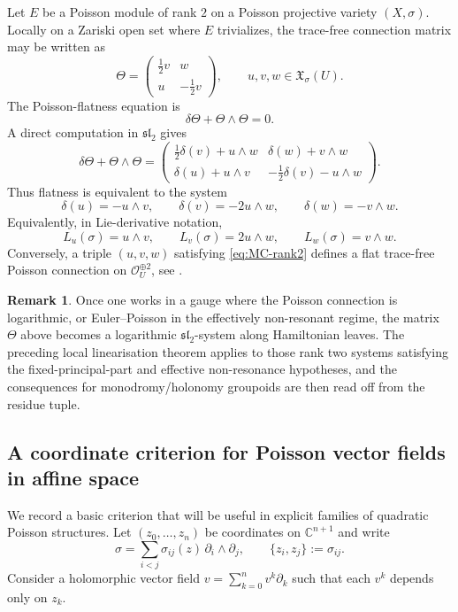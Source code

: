 \documentclass[11pt]{amsart}
\theoremstyle{plain}
\theoremstyle{definition}
\newtheorem{remark}[theorem]{Remark}
\theoremstyle{definition}
\newcommand{\OO}{\mathcal{O}}
\begin{document}
Let \(E\) be a Poisson module of rank \(2\) on a Poisson projective variety \((X,\sigma)\).  Locally on a
Zariski open set where \(E\) trivializes, the trace-free connection matrix may be written as
\[
\Theta=
\begin{pmatrix}
\frac12 v & w\\
u & -\frac12 v
\end{pmatrix},
\qquad
u,v,w\in\mathfrak X_\sigma(U).
\]
The Poisson-flatness equation is
\[
        \delta\Theta+\Theta\wedge\Theta=0.
\]
A direct computation in \(\mathfrak{sl}_2\) gives
\[
\delta\Theta+\Theta\wedge\Theta=
\begin{pmatrix}
\frac12\delta(v)+u\wedge w & \delta(w)+v\wedge w\\
\delta(u)+u\wedge v & -\frac12\delta(v)-u\wedge w
\end{pmatrix}.
\]
Thus flatness is equivalent to the system
\begin{equation}\label{eq:MC-rank2}
\delta(u)=-u\wedge v,
\qquad
\delta(v)=-2u\wedge w,
\qquad
\delta(w)=-v\wedge w.
\end{equation}
Equivalently, in Lie-derivative notation,
\begin{equation}\label{eq:MC-rank2-Lie}
L_u(\sigma)=u\wedge v,
\qquad
L_v(\sigma)=2u\wedge w,
\qquad
L_w(\sigma)=v\wedge w.
\end{equation}
Conversely, a triple \((u,v,w)\) satisfying \eqref{eq:MC-rank2} defines a flat trace-free Poisson connection
on \(\OO_U^{\oplus2}\), see \cite{Polishchuk97,LGV13,Cor20}.

\begin{remark}
Once one works in a gauge where the Poisson connection is logarithmic, or Euler--Poisson in the effectively non-resonant regime, the matrix \(\Theta\) above becomes a logarithmic \(\mathfrak{sl}_2\)-system along
Hamiltonian leaves.  The preceding local linearisation theorem applies to those rank two systems satisfying
the fixed-principal-part and effective non-resonance hypotheses, and the consequences for
monodromy/holonomy groupoids are then read off from the residue tuple.
\end{remark}

\subsection{A coordinate criterion for Poisson vector fields in affine space}

We record a basic criterion that will be useful in explicit families of quadratic Poisson structures.
Let $(z_0,\dots,z_n)$ be coordinates on $\mathbb C^{n+1}$ and write
$$
\sigma=\sum_{i<j}\sigma_{ij}(z)\,\partial_i\wedge\partial_j,
\qquad
\{z_i,z_j\}:=\sigma_{ij}.
$$
Consider a holomorphic vector field $v=\sum_{k=0}^n v^k\partial_k$ such that each $v^k$ depends only on $z_k$.
\end{document}

